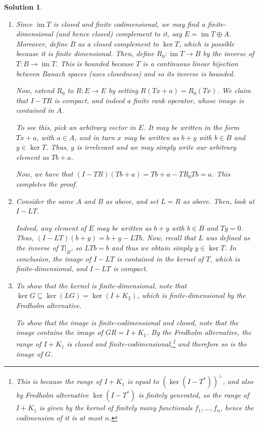 \documentclass{article}
\theoremstyle{nonumberplain}
\newtheorem{sol}{Solution}
\DeclareMathOperator{\image}{im}
\begin{document}
\begin{sol}
\leavevmode
\begin{enumerate}
\item Since $\image T$ is closed and finite codimensional, we may find a finite-dimensional (and hence closed) complement to it, say $E = \image T \oplus A$. Moreover, define $B$ as a closed complement to $\ker T$, which is possible because it is finite dimensional. Then, define $R_0 \colon \image T \to B$ by the inverse of $T \colon B \to \image T$. This is bounded because $T$ is a continuous linear bijection between Banach spaces (uses closedness) and so its inverse is bounded.

Now, extend $R_0$ to $R \colon E \to E$ by setting $R(Tx + a) = R_0(Tx)$. We claim that $I - TR$ is compact, and indeed a finite rank operator, whose image is contained in $A$.

To see this, pick an arbitrary vector in $E$. It may be written in the form $Tx + a$, with $a \in A$, and in turn $x$ may be written as $b + y$ with $b \in B$ and $y \in \ker T$. Thus, $y$ is irrelevant and we may simply write our arbitrary element as $Tb + a$.

Now, we have that $(I-TR)(Tb+a) = Tb + a - T R_0 Tb = a$. This completes the proof.

\item Consider the same $A$ and $B$ as above, and set $L = R$ as above. Then, look at $I - LT$.

Indeed, any element of $E$ may be written as $b + y$ with $b \in B$ and $Ty = 0$. Thus, $(I - LT)(b+y) = b + y - LTb$. Now, recall that $L$ was defined as the inverse of $T|_B$, so $LTb = b$ and thus we obtain simply $y \in \ker T$. In conclusion, the image of $I - LT$ is contained in the kernel of $T$, which is finite-dimensional, and $I-LT$ is compact.

\item To show that the kernel is finite-dimensional, note that $\ker G \subseteq \ker(LG) = \ker(I+K_2)$, which is finite-dimensional by the Fredholm alternative.

To show that the image is finite-codimensional and closed, note that the image contains the image of $GR = I + K_1$. By the Fredholm alternative, the range of $I + K_1$ is closed and finite-codimensional,\footnote{This is because the range of $I + K_1$ is equal to $(\ker(I-T^*))^\perp$, and also by Fredholm alternative $\ker(I-T^*)$ is finitely generated, so the range of $I + K_1$ is given by the kernel of finitely many functionals $f_1, \dots, f_n$, hence the codimension of it is at most $n$.} and therefore so is the image of $G$.
\end{enumerate}
\end{sol}
\end{document}
